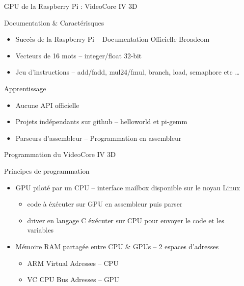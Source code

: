 \documentclass{bredelebeamer}
\begin{document}
\begin{frame}{GPU de la Raspberry Pi : VideoCore IV 3D}

\begin{block}{Documentation \& Caractérisques}
\begin{itemize}
\item Succès de la Raspberry Pi -- Documentation Officielle Broadcom
\item Vecteurs de 16 mots -- integer/float 32-bit
\item Jeu d'instructions -- add/fadd, mul24/fmul, branch, load, semaphore etc \ldots
\end{itemize}
\end{block}

\begin{block}{Apprentissage}
\begin{itemize}
\item Aucune API officielle
\item Projets indépendants sur github -- helloworld et pi-gemm
\item Parseurs d'assembleur -- Programmation en assembleur
\end{itemize}
\end{block}

\end{frame}


\begin{frame}{Programmation du VideoCore IV 3D}

\begin{alertblock}{Principes de programmation}
\begin{itemize}
\item GPU piloté par un CPU -- interface mailbox disponible sur le noyau Linux
	\begin{itemize}
		\item code à éxécuter sur GPU en assembleur puis parser
		\item driver en langage C éxécuter sur CPU pour envoyer le code et les variables
	\end{itemize}
\item Mémoire RAM partagée entre CPU \& GPUs -- 2 espaces d'adresses
	\begin{itemize}
		\item ARM Virtual Adresses -- CPU
		\item VC CPU Bus Adresses -- GPU
	\end{itemize}
\end{itemize}
\end{alertblock}

\end{frame}
\end{document}
